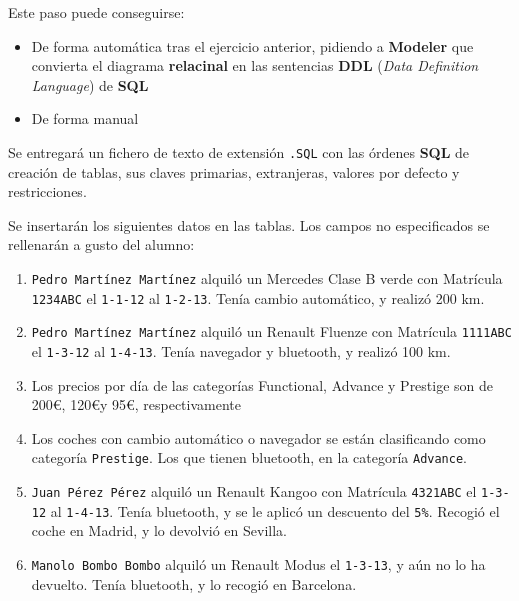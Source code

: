 \begin{homeworkProblem}
  Este paso puede conseguirse:
  \begin{itemize}
  \item De forma automática tras el ejercicio anterior, pidiendo a \textbf{Modeler} que convierta el diagrama \textbf{relacinal} en las sentencias \textbf{DDL} (\textit{Data Definition Language}) de \textbf{SQL}
  \item De forma manual
  \end{itemize}

  Se entregará un fichero de texto de extensión \texttt{.SQL} con las órdenes \textbf{SQL} de creación de tablas, sus claves primarias, extranjeras, valores por defecto y restricciones.

\end{homeworkProblem}



\begin{homeworkProblem}
Se insertarán los siguientes datos en las tablas. Los campos no especificados se
rellenarán a gusto del alumno:

\begin{enumerate}
\item  \texttt{Pedro Martínez Martínez} alquiló un Mercedes Clase B verde con
Matrícula \texttt{1234ABC} el \texttt{1-1-12} al \texttt{1-2-13}. Tenía cambio automático, y
realizó 200 km.
\item  \texttt{Pedro Martínez Martínez} alquiló un Renault Fluenze con Matrícula
\texttt{1111ABC} el \texttt{1-3-12} al \texttt{1-4-13}. Tenía navegador y bluetooth, y realizó
100 km.
\item  Los precios por día de las categorías Functional, Advance y Prestige
son de 200\euro, 120\euro y 95\euro, respectivamente

\item  Los coches con cambio automático o navegador se están clasificando
como categoría \texttt{Prestige}. Los que tienen bluetooth, en la categoría
\texttt{Advance}.
\item  \texttt{Juan Pérez Pérez} alquiló un Renault Kangoo con Matrícula \texttt{4321ABC} el
\texttt{1-3-12} al \texttt{1-4-13}. Tenía bluetooth, y se le aplicó un descuento del \texttt{5\%}.
Recogió el coche en Madrid, y lo devolvió en Sevilla.
\item  \texttt{Manolo Bombo Bombo} alquiló un Renault Modus el \texttt{1-3-13}, y aún no lo
  ha devuelto. Tenía bluetooth, y lo recogió en Barcelona.
\end{enumerate}
\end{homeworkProblem}


